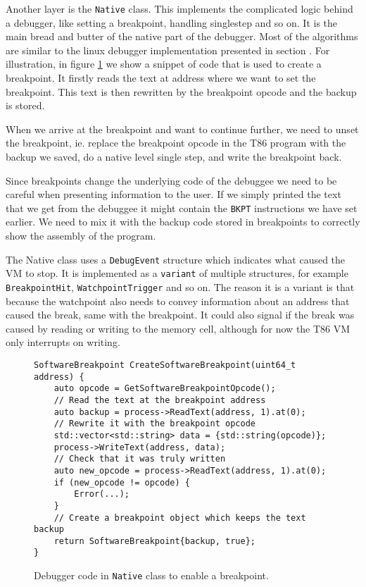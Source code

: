 Another layer is the \texttt{Native} class. This implements the complicated
logic behind a debugger, like setting a breakpoint, handling singlestep and so
on. It is the main bread and butter of the native part of the debugger. Most of
the algorithms are similar to the linux debugger implementation presented in
section . For illustration, in figure \ref{t86dbg:breakpoint} we show
a snippet of code that is used to create a breakpoint. It firstly reads the
text at address where we want to set the breakpoint. This text is then
rewritten by the breakpoint opcode and the backup is stored.

When we arrive at the breakpoint and want to continue further, we need to unset
the breakpoint, ie. replace the breakpoint opcode in the T86 program with the
backup we saved, do a native level single step, and write the breakpoint back.

Since breakpoints change the underlying code of the debuggee we need to be
careful when presenting information to the user. If we simply printed the text
that we get from the debuggee it might contain the \texttt{BKPT} instructions
we have set earlier. We need to mix it with the backup code stored in
breakpoints to correctly show the assembly of the program.

The Native class uses a \texttt{DebugEvent} structure which indicates what
caused the VM to stop. It is implemented as a \texttt{variant} of multiple
structures, for example \texttt{BreakpointHit}, \texttt{WatchpointTrigger} and
so on. The reason it is a variant is that because the watchpoint also needs to
convey information about an address that caused the break, same with the
breakpoint. It could also signal if the break was caused by reading or writing
to the memory cell, although for now the T86 VM only interrupts on writing.

\begin{figure}
    \begin{verbatim}
SoftwareBreakpoint CreateSoftwareBreakpoint(uint64_t address) {
    auto opcode = GetSoftwareBreakpointOpcode();
    // Read the text at the breakpoint address
    auto backup = process->ReadText(address, 1).at(0);
    // Rewrite it with the breakpoint opcode
    std::vector<std::string> data = {std::string(opcode)};
    process->WriteText(address, data);
    // Check that it was truly written
    auto new_opcode = process->ReadText(address, 1).at(0);
    if (new_opcode != opcode) {
        Error(...);
    }
    // Create a breakpoint object which keeps the text backup
    return SoftwareBreakpoint{backup, true};
}
    \end{verbatim}
    \caption{Debugger code in \texttt{Native} class to enable a breakpoint.}
    \label{t86dbg:breakpoint}
\end{figure}

